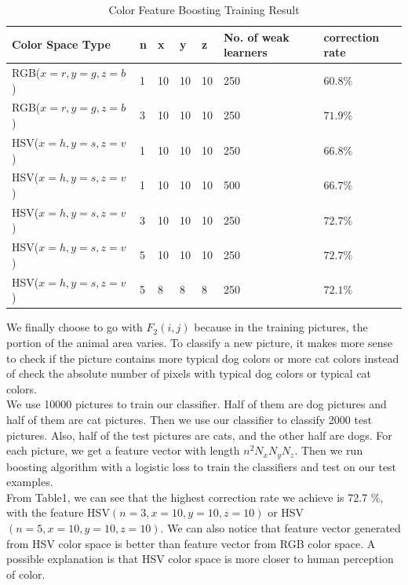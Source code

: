 \documentclass[12pt]{article}
\begin{document}
\begin{table}[h]
\caption{Color Feature Boosting Training Result}
\centering
\begin{tabular}{| l | l | l | l | l | l | l |}
\hline
Color Space Type & n & x & y & z & No. of weak learners & correction rate\\
\hline
RGB($x = r, y = g, z = b$) & 1 & 10 & 10 & 10 & 250 & $60.8 \%$\\
\hline
RGB($x = r, y = g, z = b$) & 3 & 10 & 10 & 10 & 250 & $71.9 \%$\\
\hline
HSV($x = h, y = s, z = v$) & 1 & 10 & 10 & 10 & 250 & $66.8 \%$\\
\hline
HSV($x = h, y = s, z = v$) & 1 & 10 & 10 & 10 & 500 & $66.7 \%$\\
\hline
HSV($x = h, y = s, z = v$) & 3 & 10 & 10 & 10 & 250 & $72.7 \%$\\
\hline
HSV($x = h, y = s, z = v$) & 5 & 10 & 10 & 10 & 250 & $72.7 \%$\\
\hline
HSV($x = h, y = s, z = v$) & 5 & 8 & 8 & 8 & 250 & $72.1 \%$\\
\hline
\end{tabular}
\end{table}
We finally choose to go with $F_2(i, j)$ because in the training pictures, the portion of the animal area varies. To classify a new picture, it makes more sense to check if the picture contains more typical dog colors or more cat colors instead of check the absolute number of pixels with typical dog colors or typical cat colors. \\
We use 10000 pictures to train our classifier. Half of them are dog pictures and half of them are cat pictures. Then we use our classifier to classify 2000 test pictures. Also, half of the test pictures are cats, and the other half are dogs. For each picture, we get a feature vector with length $n^2 N_x N_y N_z$. Then we run boosting algorithm with a logistic loss to train the classifiers and test on our test examples.\\
From Table1, we can see that the highest correction rate we achieve is 72.7 \%, with the feature HSV$(n =3 ,x = 10, y = 10, z = 10)$ or HSV$(n =5 ,x = 10, y = 10, z = 10)$. We can also notice that feature vector generated from HSV color space is better than feature vector from RGB color space.   A possible explanation is that HSV color space is more closer to human perception of color.
\end{document}
